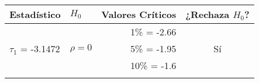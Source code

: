 \begin{table}[ht]
\begin{tabular}{llrc}
	\cline{1-2}
		Estadístico    			& $H_0$ 							& Valores Críticos 	& ¿Rechaza $H_0$? \\
		\hline
	\cline{1-4}				
							&								& 1\%   = -2.66		&			\\
		 $\tau_1$ = -3.1472		& $\rho=0$						& 5\%   = -1.95		&       Sí		\\
							&  								& 10\% = -1.6		&       		\\
	
							
	\lasthline
	\end{tabular}
\label{table:IEDU}
\end{table}







